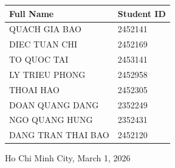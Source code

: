 \documentclass[12pt]{article}
\begin{document}
\begin{titlepage}
\begin{table}[h!]
  \centering
  \begin{tabular}{ll}
    \hline
    \textbf{Full Name} & \textbf{Student ID} \\
    \hline
    QUACH GIA BAO      & 2452141 \\
    DIEC TUAN CHI     & 2452169 \\
    TO QUOC TAI   & 2453141\\
    LY TRIEU PHONG & 2452958\\
    THOAI HAO & 2452305\\
    DOAN QUANG DANG & 2352249\\
    NGO QUANG HUNG & 2352431\\
    DANG TRAN THAI BAO & 2452120\\
    \hline
  \end{tabular}
  \label{tab:students}
\end{table}
  {\footnotesize Ho Chi Minh City, March 1, 2026}
\end{titlepage}


\newpage

\newpage
\tableofcontents

\newpage




\newpage
\end{document}
